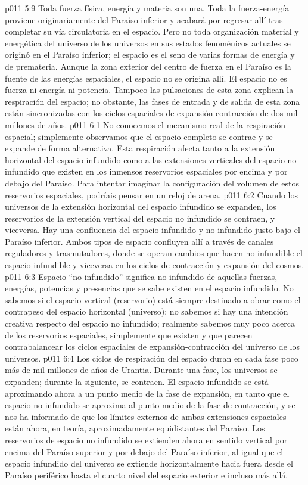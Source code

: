 \vs p011 5:9 \pc Toda fuerza física, energía y materia son una. Toda la fuerza\hyp{}energía proviene originariamente del Paraíso inferior y acabará por regresar allí tras completar su vía circulatoria en el espacio. Pero no toda organización material y energética del universo de los universos en sus estados fenoménicos actuales se originó en el Paraíso inferior; el espacio es el seno de varias formas de energía y de premateria. Aunque la zona exterior del centro de fuerza en el Paraíso es la fuente de las energías espaciales, el espacio no se origina allí. El espacio no es fuerza ni energía ni potencia. Tampoco las pulsaciones de esta zona explican la respiración del espacio; no obstante, las fases de entrada y de salida de esta zona están sincronizadas con los ciclos espaciales de expansión\hyp{}contracción de dos mil millones de años.
\vs p011 6:1 No conocemos el mecanismo real de la respiración espacial; simplemente observamos que el espacio completo se contrae y se expande de forma alternativa. Esta respiración afecta tanto a la extensión horizontal del espacio infundido como a las extensiones verticales del espacio no infundido que existen en los inmensos reservorios espaciales por encima y por debajo del Paraíso. Para intentar imaginar la configuración del volumen de estos reservorios espaciales, podríais pensar en un reloj de arena.
\vs p011 6:2 Cuando los universos de la extensión horizontal del espacio infundido se expanden, los reservorios de la extensión vertical del espacio no infundido se contraen, y viceversa. Hay una confluencia del espacio infundido y no infundido justo bajo el Paraíso inferior. Ambos tipos de espacio confluyen allí a través de canales reguladores y trasmutadores, donde se operan cambios que hacen no infundible el espacio infundible y viceversa en los ciclos de contracción y expansión del cosmos.
\vs p011 6:3 \pc Espacio “no infundido” significa no infundido de aquellas fuerzas, energías, potencias y presencias que se sabe existen en el espacio infundido. No sabemos si el espacio vertical (reservorio) está siempre destinado a obrar como el contrapeso del espacio horizontal (universo); no sabemos si hay una intención creativa respecto del espacio no infundido; realmente sabemos muy poco acerca de los reservorios espaciales, simplemente que existen y que parecen contrabalancear los ciclos espaciales de expansión\hyp{}contracción del universo de los universos.
\vs p011 6:4 \pc Los ciclos de respiración del espacio duran en cada fase poco más de mil millones de años de Urantia. Durante una fase, los universos se expanden; durante la siguiente, se contraen. El espacio infundido se está aproximando ahora a un punto medio de la fase de expansión, en tanto que el espacio no infundido se aproxima al punto medio de la fase de contracción, y se nos ha informado de que los límites externos de ambas extensiones espaciales están ahora, en teoría, aproximadamente equidistantes del Paraíso. Los reservorios de espacio no infundido se extienden ahora en sentido vertical por encima del Paraíso superior y por debajo del Paraíso inferior, al igual que el espacio infundido del universo se extiende horizontalmente hacia fuera desde el Paraíso periférico hasta el cuarto nivel del espacio exterior e incluso más allá.
